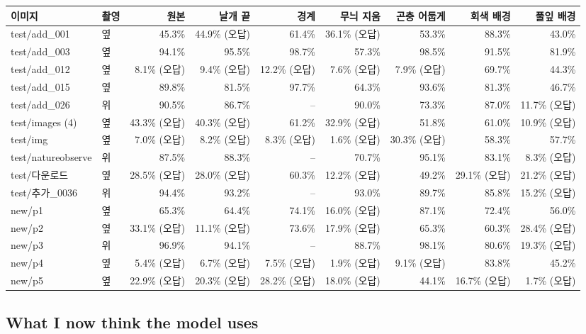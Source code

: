 \documentclass[11pt]{article}
\begin{document}
\begin{center}\footnotesize
\begin{tabular}{llrrrrrrr}
\toprule
이미지 & 촬영 & 원본 & 날개 끝 & 경계 & 무늬 지움 & 곤충 어둡게 & 회색 배경 & 풀잎 배경 \\
\midrule
test/add\_001 & 옆 & 45.3\% & 44.9\% (오답) & 61.4\% & 36.1\% (오답) & 53.3\% & 88.3\% & 43.0\% \\
test/add\_003 & 옆 & 94.1\% & 95.5\% & 98.7\% & 57.3\% & 98.5\% & 91.5\% & 81.9\% \\
test/add\_012 & 옆 & 8.1\% (오답) & 9.4\% (오답) & 12.2\% (오답) & 7.6\% (오답) & 7.9\% (오답) & 69.7\% & 44.3\% \\
test/add\_015 & 옆 & 89.8\% & 81.5\% & 97.7\% & 64.3\% & 93.6\% & 81.3\% & 46.7\% \\
test/add\_026 & 위 & 90.5\% & 86.7\% & -- & 90.0\% & 73.3\% & 87.0\% & 11.7\% (오답) \\
test/images (4) & 옆 & 43.3\% (오답) & 40.3\% (오답) & 61.2\% & 32.9\% (오답) & 51.8\% & 61.0\% & 10.9\% (오답) \\
test/img & 옆 & 7.0\% (오답) & 8.2\% (오답) & 8.3\% (오답) & 1.6\% (오답) & 30.3\% (오답) & 58.3\% & 57.7\% \\
test/natureobserve & 위 & 87.5\% & 88.3\% & -- & 70.7\% & 95.1\% & 83.1\% & 8.3\% (오답) \\
test/다운로드 & 옆 & 28.5\% (오답) & 28.0\% (오답) & 60.3\% & 12.2\% (오답) & 49.2\% & 29.1\% (오답) & 21.2\% (오답) \\
test/추가\_0036 & 위 & 94.4\% & 93.2\% & -- & 93.0\% & 89.7\% & 85.8\% & 15.2\% (오답) \\
new/p1 & 옆 & 65.3\% & 64.4\% & 74.1\% & 16.0\% (오답) & 87.1\% & 72.4\% & 56.0\% \\
new/p2 & 옆 & 33.1\% (오답) & 11.1\% (오답) & 73.6\% & 17.9\% (오답) & 65.3\% & 60.3\% & 28.4\% (오답) \\
new/p3 & 위 & 96.9\% & 94.1\% & -- & 88.7\% & 98.1\% & 80.6\% & 19.3\% (오답) \\
new/p4 & 옆 & 5.4\% (오답) & 6.7\% (오답) & 7.5\% (오답) & 1.9\% (오답) & 9.1\% (오답) & 83.8\% & 45.2\% \\
new/p5 & 옆 & 22.9\% (오답) & 20.3\% (오답) & 28.2\% (오답) & 18.0\% (오답) & 44.1\% & 16.7\% (오답) & 1.7\% (오답) \\
\bottomrule
\end{tabular}
\end{center}

\subsection*{What I now think the model uses}
\end{document}
